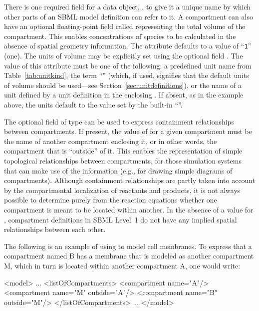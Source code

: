 \documentclass[10pt]{cekarticle}
\newenvironment{blockChanged}{\color{BrickRed}}{}
\begin{document}
\begin{blockChanged}
There is one required field for a  data object,
, to give it a unique name by which other parts of an SBML
model definition can refer to it.  A compartment can also have an optional
floating-point field called  representing the total volume
of the compartment.  This enables concentrations of species to be
calculated in the absence of spatial geometry information.  The
 attribute defaults to a value of ``\texttt{1}'' (one).  The
units of volume may be explicitly set using the optional field
.  The value of this attribute must be one of the following:
a predefined unit name from Table~\ref{tab:unitkind}, the term
``'' (which, if used, signifies that the default units of
volume should be used---see Section~\ref{sec:unitdefinitions}), or the
name of a unit defined by a unit definition in the enclosing
.  If absent, as in the example above, the units default to
the value set by the built-in ``''.
\end{blockChanged}

\begin{blockChanged}
The optional field  of type  can be used to
express containment relationships between compartments.  If present, the
value of  for a given compartment must be the name of
another compartment enclosing it, or in other words, the compartment that
is ``outside'' of it.  This enables the representation of simple
topological relationships between compartments, for those simulation
systems that can make use of the information (e.g., for drawing simple
diagrams of compartments).  Although containment relationships are partly
taken into account by the compartmental localization of reactants and
products, it is not always possible to determine purely from the reaction
equations whether one compartment is meant to be located within another.
In the absence of a value for , compartment definitions in
SBML Level~1 do not have any implied spatial relationships between each
other.
\end{blockChanged}

\begin{blockChanged}
The following is an example of using  to model cell
membranes.  To express that a compartment named B has a membrane that is
modeled as another compartment M, which in turn is located within another
compartment A, one would write:
\end{blockChanged}
\begin{example}
<model>
    ...
    <listOfCompartments>
        <compartment name="A"/>
        <compartment name="M" outside="A"/>
        <compartment name="B" outside="M"/>
    </listOfCompartments>
    ...
</model>
\end{example}
\end{document}
